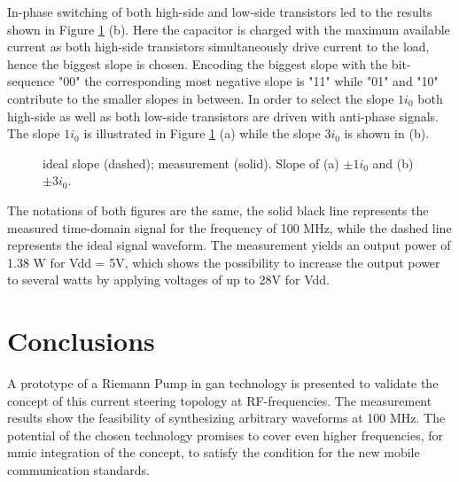 \documentclass[journal]{IEEEtran}
\begin{document}
In-phase switching of both high-side and low-side transistors led to the results shown in Figure \ref{fig:meas_Output_CLoad_100M_1io_3io} (b).
Here the capacitor is charged with the maximum available current as both high-side transistors simultaneously drive current to the load, hence the biggest slope is chosen.
Encoding the biggest slope with the bit-sequence "00" the corresponding most negative slope is "11" while "01" and "10" contribute to the smaller slopes in between.
In order to select the slope $1 i_0$ both high-side as well as both low-side transistors are driven with anti-phase signals.
The slope $1 i_0$ is illustrated in Figure \ref{fig:meas_Output_CLoad_100M_1io_3io} (a) while the slope $3 i_0$ is shown in (b).
%
\begin{figure}[htb]
  \centering
	\begin{scriptsize}
  	\def\svgwidth{\columnwidth}
 	 
  	\caption{ideal slope (dashed); measurement (solid). Slope of (a) $\pm 1  i_0$ and (b) $\pm 3 i_0$.}
  	\label{fig:meas_Output_CLoad_100M_1io_3io}
	\end{scriptsize}
\end{figure}

The notations of both figures are the same, the solid black line represents the measured time-domain signal for the frequency of 100 MHz, while the dashed line represents the ideal signal waveform.
The measurement yields an output power of 1.38 W for Vdd = 5V, which shows the possibility to increase the output power to several watts by applying voltages of up to 28V for Vdd.


\section{Conclusions}
\label{sec:conclusion}
A prototype of a Riemann Pump in \gls{gan} technology is presented to validate the concept of this current steering topology at RF-frequencies.
The measurement results show the feasibility of synthesizing arbitrary waveforms at 100 MHz.
The potential of the chosen technology promises to cover even higher frequencies, for \gls{mmic} integration 
of the concept, to satisfy the condition for the new mobile communication standards.
\end{document}
